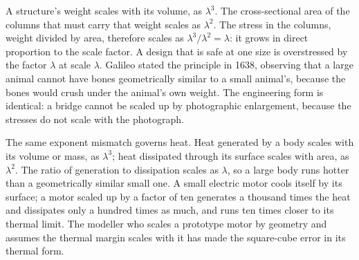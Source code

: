 A structure's weight scales with its volume, as $\lambda^3$. The
cross-sectional area of the columns that must carry that weight scales
as $\lambda^2$. The stress in the columns, weight divided by area,
therefore scales as $\lambda^3/\lambda^2 = \lambda$: it grows in direct
proportion to the scale factor. A design that is safe at one size is
overstressed by the factor $\lambda$ at scale $\lambda$. Galileo stated
the principle in 1638, observing that a large animal cannot have bones
geometrically similar to a small animal's, because the bones would
crush under the animal's own weight. The engineering form is identical:
a bridge cannot be scaled up by photographic enlargement, because the
stresses do not scale with the photograph.

The same exponent mismatch governs heat. Heat generated by a body
scales with its volume or mass, as $\lambda^3$; heat dissipated through
its surface scales with area, as $\lambda^2$. The ratio of generation to
dissipation scales as $\lambda$, so a large body runs hotter than a
geometrically similar small one. A small electric motor cools itself by
its surface; a motor scaled up by a factor of ten generates a thousand
times the heat and dissipates only a hundred times as much, and runs
ten times closer to its thermal limit. The modeller who scales a
prototype motor by geometry and assumes the thermal margin scales with
it has made the square-cube error in its thermal form.

